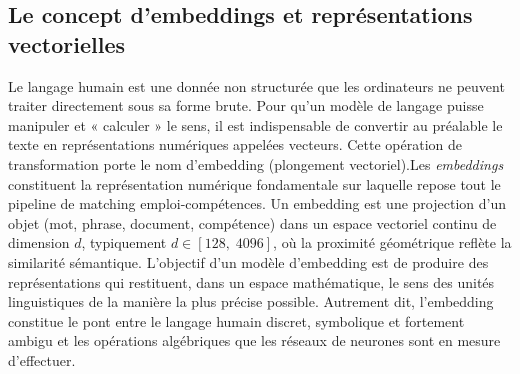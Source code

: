 \documentclass[12pt,twoside]{report}
\newcommand{\source}[1]{%
  \par\vspace{0.2\baselineskip}
  {\centering\footnotesize\itshape Source : #1\par}
}
\newcommand{\tabheader}[1]{\textcolor{white}{\textbf{#1}}}
\newcommand{\tableStyleStart}{%
  \small
  \renewcommand{\arraystretch}{1.12}%
  \setlength{\tabcolsep}{4pt}%
  \rowcolors{2}{lightblue!12}{white}%
}
\newcommand{\tableStyleEnd}{%
  \rowcolors{2}{}{}%
  \renewcommand{\arraystretch}{1}%
}
\newcommand{\BERT}{\textsc{bert}}
\begin{document}
\subsection{Le concept d'embeddings et représentations vectorielles}
Le langage humain est une donnée non structurée que les ordinateurs ne peuvent traiter directement sous sa forme brute. Pour qu'un modèle de langage puisse manipuler et « calculer » le sens, il est indispensable de convertir au préalable le texte en représentations numériques appelées vecteurs. Cette opération de transformation porte le nom d'embedding (plongement vectoriel).Les \textit{embeddings} constituent la représentation numérique fondamentale sur laquelle repose tout le pipeline de matching emploi-compétences. Un embedding est une projection
d'un objet (mot, phrase, document, compétence) dans un espace vectoriel continu de
dimension $d$, typiquement $d \in [128,\; 4096]$, où la proximité géométrique reflète
la similarité sémantique. L'objectif d'un modèle d'embedding est de produire des représentations qui restituent, dans un espace mathématique, le sens des unités linguistiques de la manière la plus précise possible. Autrement dit, l'embedding constitue le pont entre le langage humain discret, symbolique et fortement ambigu et les opérations algébriques que les réseaux de neurones sont en mesure d'effectuer.
\end{document}
